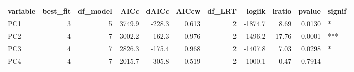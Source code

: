 
\begin{tabular}{lrrrrrrrrrl}
\toprule
variable & best\_fit & df\_model & AICc & dAICc & AICcw & df\_LRT & loglik & lratio & pvalue & signif\\
\midrule
PC1 & 3 & 5 & 3749.9 & -228.3 & 0.613 & 2 & -1874.7 & 8.69 & 0.0130 & *\\
PC2 & 4 & 7 & 3002.2 & -162.3 & 0.976 & 2 & -1496.2 & 17.76 & 0.0001 & ***\\
PC3 & 4 & 7 & 2826.3 & -175.4 & 0.968 & 2 & -1407.8 & 7.03 & 0.0298 & *\\
PC4 & 4 & 7 & 2015.7 & -305.8 & 0.519 & 2 & -1000.1 & 0.47 & 0.7914 & \\
\bottomrule
\end{tabular}
